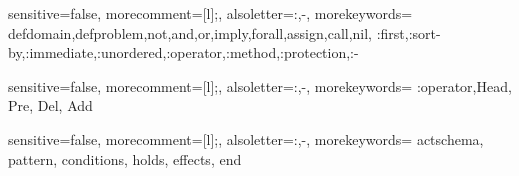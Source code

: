 {
  sensitive=false,    %
  morecomment=[l]{;}, %
  alsoletter={:,-},   %
  morekeywords={
    defdomain,defproblem,not,and,or,imply,forall,assign,call,nil,
    :first,:sort-by,:immediate,:unordered,:operator,:method,:protection,:-
  }
}

{
  sensitive=false,    %
  morecomment=[l]{;}, %
  alsoletter={:,-},   %
  morekeywords={
    :operator,Head, Pre, Del, Add
  }
}

{
  sensitive=false,    %
  morecomment=[l]{;}, %
  alsoletter={:,-},   %
  morekeywords={
    actschema, pattern, conditions, holds, effects, end
  }
}

\newlength{\listingFrameWidth}

\usepackage{bbm}


\usepackage{pifont}

\newcommand\card[2]{#2\ifthenelse{\equal{#1}{D}}{\ding{169}}{\ifthenelse{\equal{#1}{H}}{\ding{170}}{\ifthenelse{\equal{#1}{C}}{\ding{168}}{\ifthenelse{\equal{#1}{S}}{\ding{171}}{}}}}}

\usepackage{scalerel}
\usepackage{stackengine}
\usepackage{pgf}
\newcommand\openbigstar[1][0.7]{%
  \scalerel*{%
    \stackinset{c}{-.125pt}{c}{}{\scalebox{#1}{\color{white}{$\bigstar$}}}{%
      $\bigstar$}%
  }{\bigstar}
}
\newcommand{\Stars}[1]{\ensuremath{%
\pgfmathtruncatemacro{\imax}{ifthenelse(int(#1)==#1,#1-1,#1)}%
\pgfmathsetmacro{\xrest}{0.9*(1-#1+\imax)}%
\setcounter{iloop}{0}%
\loop\stepcounter{iloop}\ifnum\value{iloop}<\the\numexpr\imax+1
\bigstar\repeat
\openbigstar[\xrest]%
\setcounter{iloop}{0}%
\loop\stepcounter{iloop}\ifnum\value{iloop}<\the\numexpr5-\imax\relax
\openbigstar[.9]\repeat}}